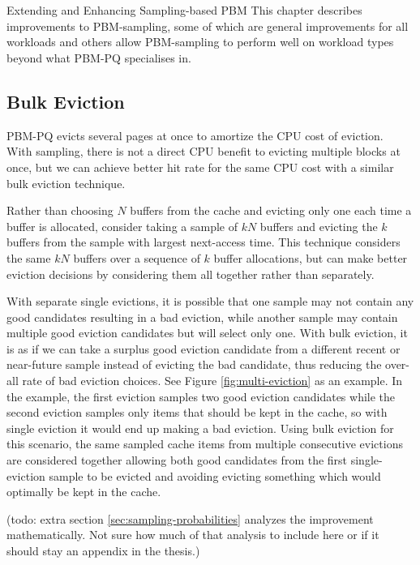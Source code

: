 
\chapter{}{Extending and Enhancing Sampling-based PBM}
This chapter describes improvements to PBM-sampling, some of which are general improvements for all workloads and others allow PBM-sampling to perform well on workload types beyond what PBM-PQ specialises in.

\section{Bulk Eviction\label{sec:sampling-bulk-eviction}}

PBM-PQ evicts several pages at once to amortize the CPU cost of eviction.~\cite{pbm} With sampling, there is not a direct CPU benefit to evicting multiple blocks at once, but we can achieve better hit rate for the same CPU cost with a similar bulk eviction technique.

Rather than choosing $N$ buffers from the cache and evicting only one each time a buffer is allocated, consider taking a sample of $kN$ buffers and evicting the $k$ buffers from the sample with largest next-access time. This technique considers the same $kN$ buffers over a sequence of $k$ buffer allocations, but can make better eviction decisions by considering them all together rather than separately.

With separate single evictions, it is possible that one sample may not contain any good candidates resulting in a bad eviction, while another sample may contain multiple good eviction candidates but will select only one. With bulk eviction, it is as if we can take a surplus good eviction candidate from a different recent or near-future sample instead of evicting the bad candidate, thus reducing the over-all rate of bad eviction choices. See Figure \ref{fig:multi-eviction}  as an example. In the example, the first eviction samples two good eviction candidates while the second eviction samples only items that should be kept in the cache, so with single eviction it would end up making a bad eviction. Using bulk eviction for this scenario, the same sampled cache items from multiple consecutive evictions are considered together allowing both good candidates from the first single-eviction sample to be evicted and avoiding evicting something which would optimally be kept in the cache.

(todo: extra section \ref{sec:sampling-probabilities} analyzes the improvement mathematically. Not sure how much of that analysis to include here or if it should stay an appendix in the thesis.)

